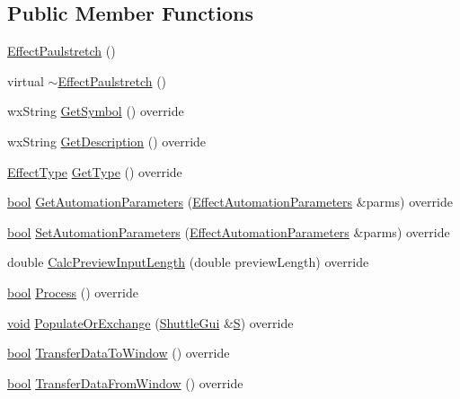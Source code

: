 \subsection*{Public Member Functions}
\begin{DoxyCompactItemize}
\item 
\hyperlink{class_effect_paulstretch_a6424844a2b609e3604cce7480f69981b}{Effect\+Paulstretch} ()
\item 
virtual \hyperlink{class_effect_paulstretch_a52b02b65c6c075b2187d97000a776210}{$\sim$\+Effect\+Paulstretch} ()
\item 
wx\+String \hyperlink{class_effect_paulstretch_a92168bb63fe5d10d6169577dddf84653}{Get\+Symbol} () override
\item 
wx\+String \hyperlink{class_effect_paulstretch_a18ca47908e6686f506086995cf2adc32}{Get\+Description} () override
\item 
\hyperlink{_effect_interface_8h_a4809a7bb3fd1a421902a667cc1405d43}{Effect\+Type} \hyperlink{class_effect_paulstretch_a2289988f80324c4abe9f8a35009ffd80}{Get\+Type} () override
\item 
\hyperlink{mac_2config_2i386_2lib-src_2libsoxr_2soxr-config_8h_abb452686968e48b67397da5f97445f5b}{bool} \hyperlink{class_effect_paulstretch_ab81d9540b6bdf9fe13d127ced3837dfb}{Get\+Automation\+Parameters} (\hyperlink{class_effect_automation_parameters}{Effect\+Automation\+Parameters} \&parms) override
\item 
\hyperlink{mac_2config_2i386_2lib-src_2libsoxr_2soxr-config_8h_abb452686968e48b67397da5f97445f5b}{bool} \hyperlink{class_effect_paulstretch_aa33fb7b20cd97d55351d239840d85f73}{Set\+Automation\+Parameters} (\hyperlink{class_effect_automation_parameters}{Effect\+Automation\+Parameters} \&parms) override
\item 
double \hyperlink{class_effect_paulstretch_a0c8904ca7786381b5182f2adf604ebf7}{Calc\+Preview\+Input\+Length} (double preview\+Length) override
\item 
\hyperlink{mac_2config_2i386_2lib-src_2libsoxr_2soxr-config_8h_abb452686968e48b67397da5f97445f5b}{bool} \hyperlink{class_effect_paulstretch_a6c20b56e48e9014090d8d20012184a94}{Process} () override
\item 
\hyperlink{sound_8c_ae35f5844602719cf66324f4de2a658b3}{void} \hyperlink{class_effect_paulstretch_a0dac1f2544c782b4d68a1460aa2683a6}{Populate\+Or\+Exchange} (\hyperlink{class_shuttle_gui}{Shuttle\+Gui} \&\hyperlink{xlftab_8c_af933676109efed7ab34cea71d748a517}{S}) override
\item 
\hyperlink{mac_2config_2i386_2lib-src_2libsoxr_2soxr-config_8h_abb452686968e48b67397da5f97445f5b}{bool} \hyperlink{class_effect_paulstretch_a69955218aeaf03c2aba4b0f845f31ab2}{Transfer\+Data\+To\+Window} () override
\item 
\hyperlink{mac_2config_2i386_2lib-src_2libsoxr_2soxr-config_8h_abb452686968e48b67397da5f97445f5b}{bool} \hyperlink{class_effect_paulstretch_ad9366ea898eacb3f3f68c0e051697efa}{Transfer\+Data\+From\+Window} () override
\end{DoxyCompactItemize}
